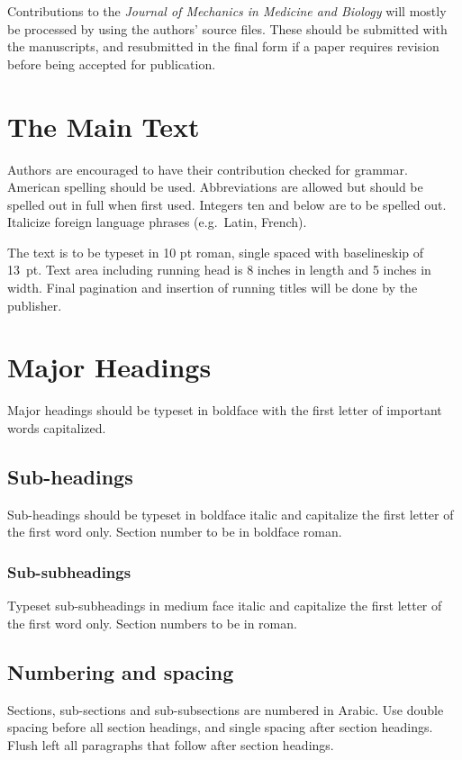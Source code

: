 \documentclass{ws-jmmb}
\begin{document}
Contributions to the {\it Journal of Mechanics in Medicine and
Biology} will mostly be processed by using the \hbox{authors'} source
files. These should be submitted with the manuscripts, and resubmitted
in the final form if a paper requires revision before being accepted
for publication.

\section{The Main Text}

Authors are encouraged to have their contribution checked for grammar.
American spelling should be used. Abbreviations are allowed but should
be spelled out in full when first used. Integers ten and below are to be
spelled out. Italicize foreign language phrases (e.g.~Latin, French).

The text is to be typeset in 10 pt roman, single spaced with
baselineskip of 13~pt. Text area including running head is 8 inches in
length and 5 inches in width. Final pagination and insertion of
running titles will be done by the publisher.

\section{Major Headings}

Major headings should be typeset in boldface with the first letter of
important words capitalized.

\subsection{Sub-headings}

Sub-headings should be typeset in boldface italic and capitalize
the first letter of the first word only. Section number to be in
boldface roman.

\subsubsection{Sub-subheadings}

Typeset sub-subheadings in medium face italic and capitalize the
first letter of the first word only. Section numbers to be in
roman.

\subsection{Numbering and spacing}

Sections, sub-sections and sub-subsections are numbered in
Arabic.  Use double spacing before all section headings, and
single spacing after section headings. Flush left all paragraphs
that follow after section headings.
\end{document}

